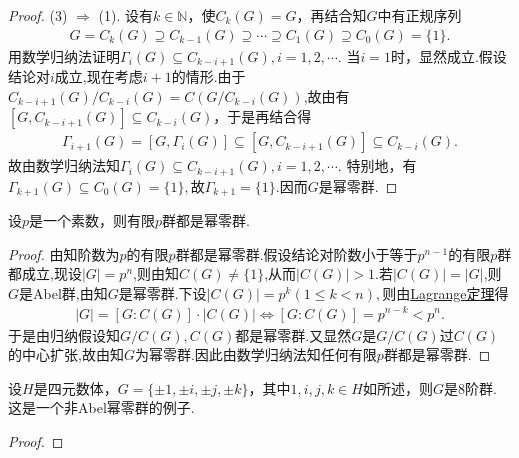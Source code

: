 \documentclass[../../main.tex]{subfiles}%
\begin{document}
\begin{proof}
(3) $\Rightarrow$ (1). 设有$k\in \mathbb{N}$，使$C_k(G) = G$，再结合知$G$中有正规序列
\begin{align*}
G = C_k(G) \supseteq C_{k-1}(G) \supseteq \cdots \supseteq C_1(G) \supseteq C_0(G) = \{1\}.
\end{align*}
用数学归纳法证明$\Gamma_i(G) \subseteq C_{k - i + 1}(G),i=1,2,\cdots$. 当$i = 1$时，显然成立.假设结论对$i$成立,现在考虑$i+1$的情形.由于$C_{k - i + 1}(G)/C_{k - i}(G) = C(G/C_{k - i}(G))$,故由有$[G, C_{k - i + 1}(G)] \subseteq C_{k - i}(G)$，于是再结合得
\begin{align*}
\Gamma_{i+1}(G) = [G, \Gamma_i(G)] \subseteq [G, C_{k - i + 1}(G)] \subseteq C_{k - i}(G).
\end{align*}
故由数学归纳法知$\Gamma_i(G) \subseteq C_{k - i + 1}(G),i=1,2,\cdots$.
特别地，有$\Gamma_{k+1}(G) \subseteq C_0(G) = \{1\},$故$\Gamma_{k+1}=\{1\}$.因而$G$是幂零群.
\end{proof}

\begin{theorem}
设$p$是一个素数，则有限$p$群都是幂零群.
\end{theorem}
\begin{proof}
由知阶数为$p$的有限$p$群都是幂零群.假设结论对阶数小于等于$p^{n-1}$的有限$p$群都成立,现设$|G|=p^n$,则由知$C(G) \neq \{1\}$,从而$|C(G)|>1.$若$|C(G)|=|G|$,则$G$是Abel群,由知$G$是幂零群.下设$|C(G)|=p^k(1\leqslant k<n),$则由\hyperref[theorem:抽象代数--Lagrange定理]{Lagrange定理}得
\begin{align*}
\left| G \right|=\left[ G:C\left( G \right) \right] \cdot \left| C\left( G \right) \right|\Longleftrightarrow \left[ G:C\left( G \right) \right] =p^{n-k}<p^n.
\end{align*}
于是由归纳假设知$G/C\left( G \right) ,C\left( G \right) $都是幂零群.又显然$G$是$G/C(G)$过$C(G)$的中心扩张,故由知$G$为幂零群.因此由数学归纳法知任何有限$p$群都是幂零群.
\end{proof}

\begin{example}
设$H$是四元数体，$G = \{\pm 1, \pm i, \pm j, \pm k\}$，其中$1, i, j, k \in H$如所述，则$G$是8阶群. 这是一个非Abel幂零群的例子.
\end{example}
\begin{proof}

\end{proof}
\end{document}
